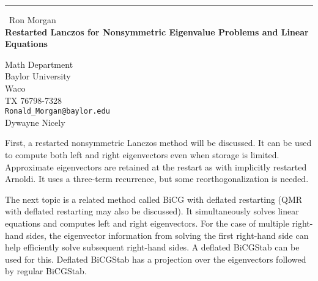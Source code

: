 \documentclass{report}
\begin{document}
\begin{center}
\rule{6in}{1pt} \
{\large Ron Morgan \\
{\bf Restarted Lanczos for Nonsymmetric Eigenvalue Problems and Linear Equations}}

Math Department \\ Baylor University \\ Waco \\ TX 76798-7328
\\
{\tt Ronald\_Morgan@baylor.edu}\\
Dywayne Nicely\end{center}

First, a restarted nonsymmetric Lanczos method will be discussed. It can
be used to compute both left and right eigenvectors even when storage is
limited. Approximate eigenvectors are retained at the restart as with
implicitly restarted Arnoldi. It uses a three-term recurrence, but some
reorthogonalization is needed.

The next topic is a related method called BiCG with deflated restarting
(QMR with deflated restarting may also be discussed). It simultaneously
solves linear equations and computes left and right eigenvectors. For the
case of multiple right-hand sides, the eigenvector information from
solving the first right-hand side can help efficiently solve subsequent
right-hand sides. A deflated BiCGStab can be used for this. Deflated
BiCGStab has a projection over the eigenvectors followed by regular
BiCGStab.
\end{document}

